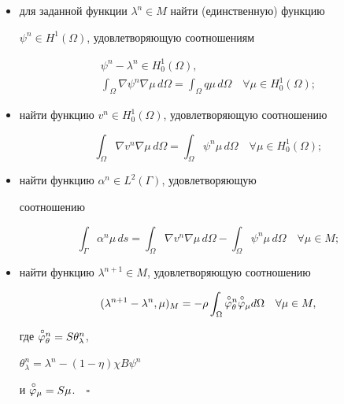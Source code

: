 \begin{itemize} 


\item[а)] для заданной функции $\lambda^n\in M$ найти (единственную) функцию 


$\psi^n\in H^1(\Omega)$, удовлетворяющую соотношениям 


\begin{gather} 


\psi^n-\lambda^n\in H^1_0(\Omega),\\ 


\int_\Omega\nabla\psi^n 


\nabla\mu\,d\Omega=\int_\Omega q\mu\,d\Omega\quad \forall\mu\in H^1_0(\Omega); 


\end{gather} 


\item[б)] найти функцию $v^n\in H^1_0(\Omega)$, удовлетворяющую соотношению 


\begin{equation} 


\int_\Omega\nabla v^n 


\nabla\mu\,d\Omega=\int_\Omega \psi^n\mu\,d\Omega\quad \forall\mu\in H^1_0(\Omega); 


\end{equation} 


\item[в)] найти функцию $\alpha^n\in L^2(\Gamma)$, удовлетворяющую 


соотношению 


\begin{equation} 


\int_\Gamma \alpha^n\mu\,ds=\int_\Omega 


\nabla v^n\nabla\mu\,d\Omega-\int_\Omega \psi^n\mu\,d\Omega


\quad \forall\mu\in M; 


\end{equation} 


\item[г)] найти функцию $\lambda^{n+1}\in M$, удовлетворяющую соотношению 


\begin{equation} 


(\lambda^{n+1}-\lambda^n,\mu)_M=-\rho 


\int_\Omega \up{\varphi}^n_\theta\up{\varphi}_\mu d\Omega


\quad \forall\mu\in M, 


\end{equation} 


где $\overset{\,\circ}{\varphi}{}^n_\theta=S\theta^n_\lambda$, 


$\theta^n_\lambda=\lambda^n-(1-\eta)\chi B\psi^n$


и $\overset{\,\circ}{\varphi}{}_\mu=S\mu$.$\quad\square$


\end{itemize} 


